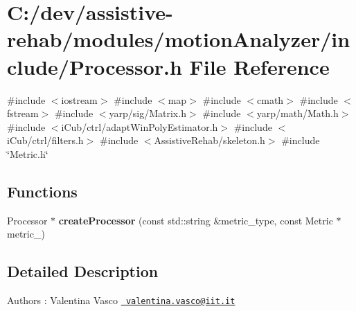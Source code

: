 \section{C\+:/dev/assistive-\/rehab/modules/motion\+Analyzer/include/\+Processor.h File Reference}
\label{Processor_8h}
{\ttfamily \#include $<$iostream$>$}\newline
{\ttfamily \#include $<$map$>$}\newline
{\ttfamily \#include $<$cmath$>$}\newline
{\ttfamily \#include $<$fstream$>$}\newline
{\ttfamily \#include $<$yarp/sig/\+Matrix.\+h$>$}\newline
{\ttfamily \#include $<$yarp/math/\+Math.\+h$>$}\newline
{\ttfamily \#include $<$i\+Cub/ctrl/adapt\+Win\+Poly\+Estimator.\+h$>$}\newline
{\ttfamily \#include $<$i\+Cub/ctrl/filters.\+h$>$}\newline
{\ttfamily \#include $<$Assistive\+Rehab/skeleton.\+h$>$}\newline
{\ttfamily \#include \char`\"{}Metric.\+h\char`\"{}}\newline
\subsection*{Functions}
\begin{DoxyCompactItemize}
\item 
\mbox{\label{Processor_8h_a0ae4c67160d19584fcd102d4616a5bee}} 
Processor $\ast$ {\bfseries create\+Processor} (const std\+::string \&metric\+\_\+type, const Metric $\ast$metric\+\_\+)
\end{DoxyCompactItemize}


\subsection{Detailed Description}
\begin{DoxyAuthor}{Authors}
\+: Valentina Vasco \href{mailto:valentina.vasco@iit.it}{\texttt{ valentina.\+vasco@iit.\+it}} 
\end{DoxyAuthor}

